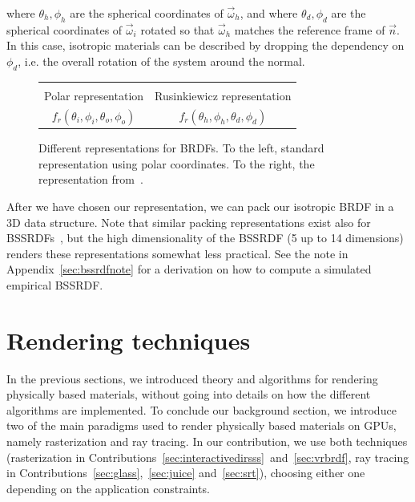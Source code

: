 where $\theta_h, \phi_h$ are the spherical coordinates of $\vec{\omega}_h$, and where $\theta_d, \phi_d$ are the spherical coordinates of $\vec{\omega}_i$ rotated so that $\vec{\omega}_h$ matches the reference frame of $\vec{n}$. In this case,  isotropic materials can be described by dropping the dependency on $\phi_d$, i.e. the overall rotation of the system around the normal.
\begin{figure}
\centering
\begin{tabular}{@{}c@{\hskip 1em}c@{}}
\def\svgwidth{0.45\textwidth} &  \def\svgwidth{0.45\textwidth} \\
Polar representation &  Rusinkiewicz representation \\
$f_r(\theta_i, \phi_i, \theta_o, \phi_o)$ &  $f_r(\theta_h, \phi_h, \theta_d, \phi_d)$ \\
\end{tabular}
\caption{Different representations for BRDFs. To the left, standard representation using polar coordinates. To the right, the representation from~\cite{Rusinkiewicz1998}. } 
\label{fig:brdfrepr}
\end{figure}

After we have chosen our representation, we can pack our isotropic BRDF in a 3D data structure. Note that similar packing representations exist also for BSSRDFs~\cite{Donner2009}, but the high dimensionality of the BSSRDF (5 up to 14 dimensions) renders these representations somewhat less practical. See the note in Appendix~\ref{sec:bssrdfnote} for a derivation on how to compute a simulated empirical BSSRDF. 

\section{Rendering techniques} 
\label{sec:renderingparadigms}

In the previous sections, we introduced theory and algorithms for rendering physically based materials, without going into details on how the different algorithms are implemented. To conclude our background section, we introduce two of the main paradigms used to render physically based materials on GPUs, namely rasterization and ray tracing. In our contribution, we use both techniques (rasterization in Contributions~\ref{sec:interactivedirsss}~and~\ref{sec:vrbrdf}, ray tracing in Contributions~\ref{sec:glass},~\ref{sec:juice} and~\ref{sec:srt}), choosing either one depending on the application constraints.

